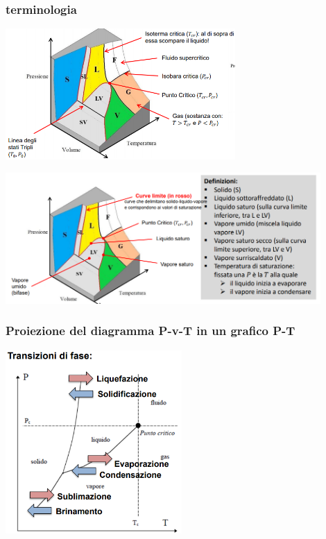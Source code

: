 \subsubsection{terminologia}
\begin{center}
    \includegraphics[height=5cm]{../L04/img2.PNG}
\end{center}
\begin{center}
    \includegraphics[height=5cm]{../L04/img1.PNG}
\end{center}
\subsubsection{Proiezione del diagramma P-v-T in un grafico P-T}
\begin{center}
    \includegraphics[height=7cm]{../L04/img3.PNG}
\end{center}
